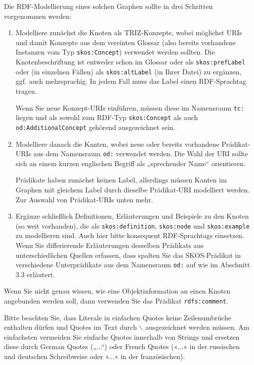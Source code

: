 \documentclass[11pt,a4paper]{article}
\begin{document}
Die RDF-Modellierung eines solchen Graphen sollte in drei Schritten
vorgenommen werden:
\begin{enumerate}
\item Modelliere zunächst die Knoten als TRIZ-Konzepte, wobei möglichst URIs
  und damit Konzepte aus dem vereinten Glossar (also bereits vorhandene
  Instanzen vom Typ \texttt{skos:Concept}) verwendet werden sollten.  Die
  Knotenbeschriftung ist entweder schon im Glossar oder als
  \texttt{skos:prefLabel} oder (in einzelnen Fällen) als
  \texttt{skos:altLabel} (in Ihrer Datei) zu ergänzen, ggf. auch
  mehrsprachig. In jedem Fall muss das Label einen RDF-Sprachtag tragen.

  Wenn Sie neue Konzept-URIs einführen, müssen diese im Namensraum
  \texttt{tc:} liegen und als sowohl zum RDF-Typ \texttt{skos:Concept} als
  auch \texttt{od:AdditionalConcept} gehörend ausgezeichnet sein.
\item Modelliere danach die Kanten, wobei neue oder bereits vorhandene
  Prädikat-URIs aus dem Namensraum \texttt{od:} verwendet werden.  Die Wahl
  der URI sollte sich an einem kurzen englischen Begriff als „sprechender
  Name“ orientieren.

  Prädikate haben zunächst keinen Label, allerdings müssen Kanten im Graphen
  mit gleichem Label durch dieselbe Prädikat-URI modelliert werden.  Zur
  Auswahl von Prädikat-URIs unten mehr. 
\item Ergänze schließlich Definitionen, Erläuterungen und Beispiele zu den
  Knoten (so weit vorhanden), die als \texttt{skos:definition},
  \texttt{skos:node} und \texttt{skos:example} zu modellieren sind. Auch hier
  bitte konsequent RDF-Sprachtags einsetzen. Wenn Sie differierende
  Erläuterungen desselben Prädikats aus unterschiedlichen Quellen erfassen,
  dass spalten Sie das SKOS-Prädikat in verschiedene Unterprädikate aus dem
  Namensraum \texttt{od:} auf wie im Abschnitt 3.3 erläutert.
\end{enumerate}
Wenn Sie nicht genau wissen, wie eine Objektinformation an einen Knoten
angebunden werden soll, dann verwenden Sie das Prädikat
\texttt{rdfs:comment}.

Bitte beachten Sie, dass Literale in einfachen Quotes keine Zeilenumbrüche
enthalten dürfen und Quotes im Text durch $\backslash$ ausgezeichnet werden
müssen. Am einfachsten vermeiden Sie einfache Quotes innerhalb von Strings und
ersetzen diese durch German Quotes („...“) oder French Quotes («...» in der
russischen und deutschen Schreibweise oder »...« in der französi\-schen).
\end{document}
